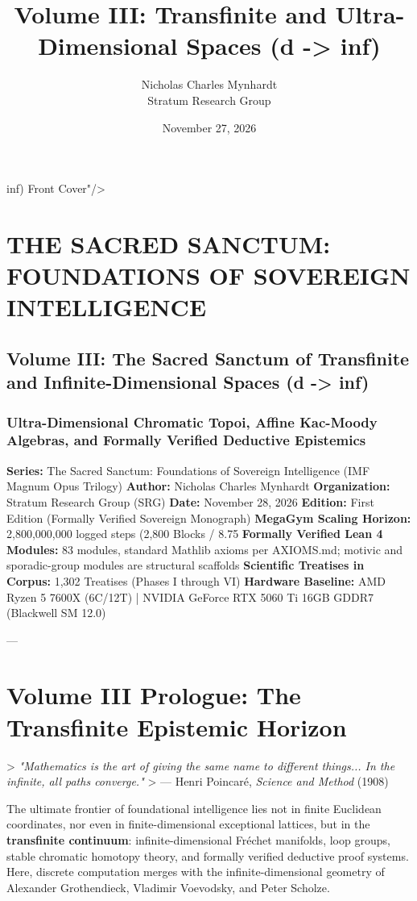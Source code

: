 \documentclass[11pt,twoside,openright]{amsbook}
\title{Volume III: Transfinite and Ultra-Dimensional Spaces (d -> inf)}
\author{Nicholas Charles Mynhardt \\ Stratum Research Group}
\date{November 27, 2026}
\begin{document}
\maketitle
\tableofcontents


   inf) Front Cover"/>


\chapter{THE SACRED SANCTUM: FOUNDATIONS OF SOVEREIGN INTELLIGENCE}
\section{Volume III: The Sacred Sanctum of Transfinite and Infinite-Dimensional Spaces (d -> inf)}
\subsection{Ultra-Dimensional Chromatic Topoi, Affine Kac-Moody Algebras, and Formally Verified Deductive Epistemics}

\textbf{Series:} The Sacred Sanctum: Foundations of Sovereign Intelligence (IMF Magnum Opus Trilogy)  
\textbf{Author:} Nicholas Charles Mynhardt  
\textbf{Organization:} Stratum Research Group (SRG)  
\textbf{Date:} November 28, 2026  
\textbf{Edition:} First Edition (Formally Verified Sovereign Monograph)  
\textbf{MegaGym Scaling Horizon:} 2,800,000,000 logged steps (2,800 Blocks / 8.75%
\textbf{Formally Verified Lean 4 Modules:} 83 modules, standard Mathlib axioms per AXIOMS.md; motivic and sporadic-group modules are structural scaffolds  
\textbf{Scientific Treatises in Corpus:} 1,302 Treatises (Phases I through VI)  
\textbf{Hardware Baseline:} AMD Ryzen 5 7600X (6C/12T) | NVIDIA GeForce RTX 5060 Ti 16GB GDDR7 (Blackwell SM 12.0)  

---

\chapter{Volume III Prologue: The Transfinite Epistemic Horizon}

> \textit{"Mathematics is the art of giving the same name to different things... In the infinite, all paths converge."}  
> — Henri Poincaré, \textit{Science and Method} (1908)

The ultimate frontier of foundational intelligence lies not in finite Euclidean coordinates, nor even in finite-dimensional exceptional lattices, but in the \textbf{transfinite continuum}: infinite-dimensional Fréchet manifolds, loop groups, stable chromatic homotopy theory, and formally verified deductive proof systems. Here, discrete computation merges with the infinite-dimensional geometry of Alexander Grothendieck, Vladimir Voevodsky, and Peter Scholze.
\end{document}
